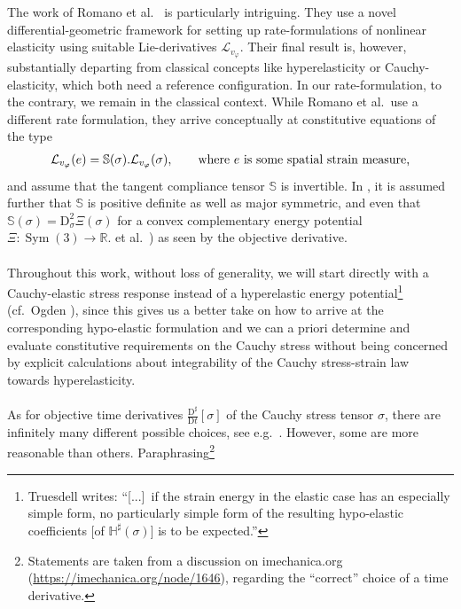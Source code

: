 \documentclass[10pt]{article}
\numberwithin{theoremCounter}{section}
\theoremstyle{plain}
\theoremstyle{definition}
\newcommand{\R}{\mathbb{R}}
\newcommand{\DD}{\mathrm{D}}
\DeclareMathOperator{\Sym}{Sym}
\def\H{\mathbb{H}}
\numberwithin{equation}{section}
\begin{document}
{
The work of Romano et al.~\cite{romano2011, romano2017, romano2014} is particularly intriguing. They use a novel differential-geometric framework for setting up rate-formulations of nonlinear elasticity using suitable Lie-derivatives $\mathcal{L}_{v_\varphi}$. Their final result is, however, substantially departing from classical concepts like hyperelasticity or Cauchy-elasticity, which both need a reference configuration. In our rate-formulation, to the contrary, we remain in the classical context. While Romano et al.~use a different rate formulation, they arrive conceptually at constitutive equations of the type
	\begin{align*}
	\mathcal{L}_{v_\varphi}(e) = \mathbb{S}(\sigma). \mathcal{L}_{v_\varphi}(\sigma), \qquad \textnormal{where $e$ is some spatial strain measure,}
	\end{align*}
and assume that the tangent compliance tensor $\mathbb{S}$ is invertible. In \cite[eq.~8]{romano2017}, it is assumed further that $\mathbb{S}$ is positive definite as well as major symmetric, and even that $\mathbb{S}(\sigma) = \DD_{\sigma}^2 \Xi(\sigma)$ for a convex complementary energy potential $\Xi\colon \Sym(3) \to \R$.
}
et al.~\cite{romano2011}) as seen by the objective derivative. \\
\\
Throughout this work, without loss of generality, we will start directly with a Cauchy-elastic stress response instead of a hyperelastic energy potential\footnote
{
Truesdell \cite[p.~88]{truesdell1955} writes: \enquote{[...]~if the strain energy in the elastic case has an especially simple form, no particularly simple form of the resulting hypo-elastic coefficients [of $\H^{\sharp}(\sigma)$] is to be expected.}
}
(cf.~Ogden \cite[sec.~4.2]{Ogden83}), since this gives us a better take on how to arrive at the corresponding hypo-elastic formulation and we can a priori determine and evaluate constitutive requirements on the Cauchy stress without being concerned by explicit calculations about integrability of the Cauchy stress-strain law towards hyperelasticity. \\
\\
As for objective time derivatives $\frac{\DD^{\sharp}}{\DD t}[\sigma]$ of the Cauchy stress tensor $\sigma$, there are infinitely many different possible choices, see e.g.~\cite{kolev2024objective, neffkoro2024}. However, some are more reasonable than others. Paraphrasing\footnote
{
Statements are taken from a discussion on imechanica.org (\url{https://imechanica.org/node/1646}), regarding the \enquote{correct} choice of a time derivative.
}
\end{document}
